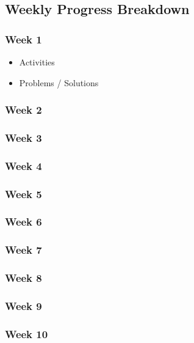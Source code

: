 \subsection{Weekly Progress Breakdown}
\subsubsection{Week 1}
\begin{itemize}
\item Activities
\item Problems / Solutions
\end{itemize}
\subsubsection{Week 2}
\subsubsection{Week 3}
\subsubsection{Week 4}
\subsubsection{Week 5}
\subsubsection{Week 6}
\subsubsection{Week 7}
\subsubsection{Week 8}
\subsubsection{Week 9}
\subsubsection{Week 10}